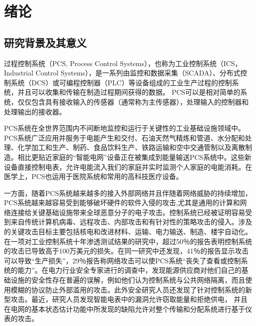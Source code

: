 

\chapter{绪论}
\label{chap:intro}

\section{研究背景及其意义}

过程控制系统（PCS, Process Control Systems），也称为工业控制系统（ICS，Industrial Control Systems），是一系列由监控和数据采集（SCADA）、分布式控制系统（DCS）或可编程控制器（PLC）等设备组成的工业生产过程的控制系统，并且可以收集和传输在制造过程期间获得的数据。 PCS可以是相对简单的系统，仅仅包含具有接收输入的传感器（通常称为主传感器），处理输入的控制器和处理输出的接收器。

PCS系统在全世界范围内不间断地监控和运行于关键性的工业基础设施领域中。PCS系统广泛应用并服务于电能产生和交付、石油天然气精炼和管道、水分配和处理、化学加工和生产、制药、食品饮料生产、铁路运输和空中交通管制以及离散制造\parencite{Stouffer11,Weiss10,Hentea08}。相比更贴近家庭的“智能电网”设备正在被集成到能量输送PCS系统中。这些新设备直接控制电表，允许电能流入我们的家庭并实时监测个人家庭的电能消耗。在医学上，PCS也运用于医院系统和常用的高科技医疗设备。

一方面，随着PCS系统越来越多的接入外部网络并且伴随着网络威胁的持续增加，PCS系统越来越容易受到能够破坏硬件的软件入侵的攻击,尤其是通用的计算和网络连接给关键基础设施带来全球恶意分子的电子攻击。控制系统已经被证明容易受到来自传统计算机病毒\parencite{Roberts08,Krebs08}、远程攻击\parencite{Grad10}、内部攻击\parencite{Leall09}和有针对性的策略攻击\parencite{Zetter10}的侵入。涉及的关键攻击目标主要包括核电和改进材料\parencite{Krebs08,Leyden08}、运输\parencite{Grad10}、电力输送\parencite{Meserve07}、制造\parencite{Roberts08}、楼宇自动化\parencite{Leall09}。
在一项对工业控制系统十年渗透测试结果的研究中，超过50％的报告表明控制系统的攻击已导致高于100万美元的损失\parencite{Byres03}。在同一研究中还发现，41％的报告显示攻击可以导致“生产损失”，29％报告称网络攻击可以使PCS系统“丧失了查看或控制系统的能力”。在电力行业安全专家进行的调查中，发现能源供应商对他们自己的基础设施的安全性存在普遍的误解，例如他们认为控制系统与公共网络隔离，而且使用模糊的协议防止外部滥用的攻击\parencite{1Pietre11}。此外安全研究人员还发现了针对控制系统的新型攻击。最近，研究人员发现智能电表中的漏洞允许窃取能量和拒绝供电\parencite{1McLaughlin09,1McLaughlin10}， 并且在电网的基本状态估计功能中所发现的缺陷允许对整个传输和分配系统进行基于仪表的攻击\parencite{1Liu09}。

